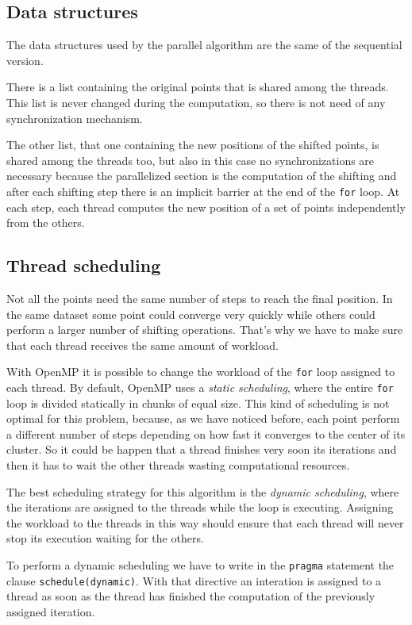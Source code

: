 \documentclass[10pt,twocolumn,letterpaper]{article}
\begin{document}
\subsection{Data structures}

The data structures used by the parallel algorithm are the same of the sequential version.

There is a list containing the original points that is shared among the threads. This list is never changed during the computation, so there is not need of any synchronization mechanism.

The other list, that one containing the new positions of the shifted points, is shared among the threads too, but also in this case no synchronizations are necessary because the parallelized section is the computation of the shifting and after each shifting step there is an implicit barrier at the end of the \verb"for" loop. At each step, each thread computes the new position of a set of points independently from the others.

\subsection{Thread scheduling}

Not all the points need the same number of steps to reach the final position. In the same dataset some point could converge very quickly while others could perform a larger number of shifting operations. That's why we have to make sure that each thread receives the same amount of workload.

With OpenMP it is possible to change the workload of the \verb"for" loop assigned to each thread. By default, OpenMP uses a \textit{static scheduling}, where the entire \verb"for" loop is divided statically in chunks of equal size. This kind of scheduling is not optimal for this problem, because, as we have noticed before, each point perform a different number of steps depending on how fast it converges to the center of its cluster. So it could be happen that a thread finishes very soon its iterations and then it has to wait the other threads wasting computational resources.

The best scheduling strategy for this algorithm is the \textit{dynamic scheduling}, where the iterations are assigned to the threads while the loop is executing. Assigning the workload to the threads in this way should ensure that each thread will never stop its execution waiting for the others.

To perform a dynamic scheduling we have to write in the \verb"pragma" statement the clause \verb"schedule(dynamic)". With that directive an interation is assigned to a thread as soon as the thread has finished the computation of the previously assigned iteration.
\end{document}
